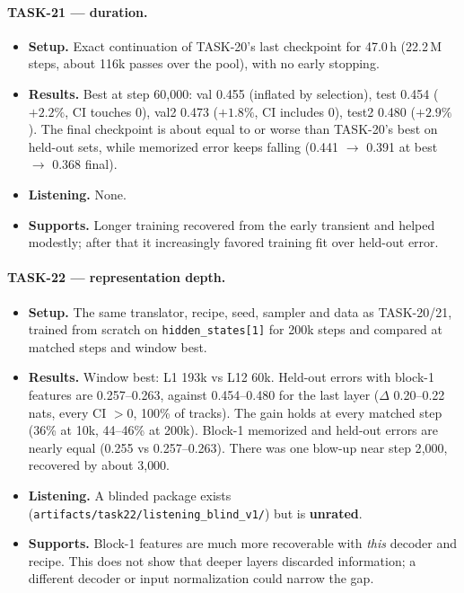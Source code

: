 \documentclass[10pt,letterpaper]{article}
\newcommand{\src}[1]{\nolinkurl{#1}}
\begin{document}
\paragraph{TASK-21 --- duration.}
\begin{itemize}
\item \textbf{Setup.} Exact continuation of TASK-20's last checkpoint for 47.0\,h (22.2\,M steps, about 116k passes over the pool), with no early stopping.
\item \textbf{Results.} Best at step 60{,}000: val 0.455 (inflated by selection), test 0.454 ($+2.2\%$, CI touches 0), val2 0.473 ($+1.8\%$, CI includes 0), test2 0.480 ($+2.9\%$). The final checkpoint is about equal to or worse than TASK-20's best on held-out sets, while memorized error keeps falling (0.441 $\to$ 0.391 at best $\to$ 0.368 final).
\item \textbf{Listening.} None.
\item \textbf{Supports.} Longer training recovered from the early transient and helped modestly; after that it increasingly favored training fit over held-out error.
\end{itemize}

\paragraph{TASK-22 --- representation depth.}
\begin{itemize}
\item \textbf{Setup.} The same translator, recipe, seed, sampler and data as TASK-20/21, trained from scratch on \texttt{hidden\_states[1]} for 200k steps and compared at matched steps and window best.
\item \textbf{Results.} Window best: L1 193k vs L12 60k. Held-out errors with block-1 features are 0.257--0.263, against 0.454--0.480 for the last layer ($\Delta$ 0.20--0.22 nats, every CI $>0$, 100\% of tracks). The gain holds at every matched step (36\% at 10k, 44--46\% at 200k). Block-1 memorized and held-out errors are nearly equal (0.255 vs 0.257--0.263). There was one blow-up near step 2{,}000, recovered by about 3{,}000.
\item \textbf{Listening.} A blinded package exists (\src{artifacts/task22/listening_blind_v1/}) but is \textbf{unrated}.
\item \textbf{Supports.} Block-1 features are much more recoverable with \emph{this} decoder and recipe. This does not show that deeper layers discarded information; a different decoder or input normalization could narrow the gap.
\end{itemize}
\end{document}
